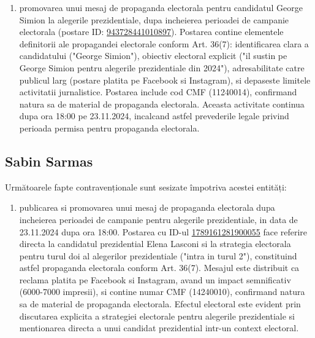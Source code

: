 \documentclass[a4paper,12pt]{article}
\begin{document}
\begin{enumerate}[leftmargin=*, label=\arabic*.)]
    \item promovarea unui mesaj de propaganda electorala pentru candidatul George Simion la alegerile prezidentiale, dupa incheierea perioadei de campanie electorala (postare ID: \href{https://www.facebook.com/ads/library/?id=943728441010897}{943728441010897}). Postarea contine elementele definitorii ale propagandei electorale conform Art. 36(7): identificarea clara a candidatului ("George Simion"), obiectiv electoral explicit ("il sustin pe George Simion pentru alegerile prezidentiale din 2024"), adresabilitate catre publicul larg (postare platita pe Facebook si Instagram), si depaseste limitele activitatii jurnalistice. Postarea include cod CMF (11240014), confirmand natura sa de material de propaganda electorala. Aceasta activitate continua dupa ora 18:00 pe 23.11.2024, incalcand astfel prevederile legale privind perioada permisa pentru propaganda electorala.
\end{enumerate}

\vspace{0.5cm}

\subsection{Sabin Sarmas}
Următoarele fapte contravenționale sunt sesizate împotriva acestei entități:

\begin{enumerate}[leftmargin=*, label=\arabic*.)]
    \item publicarea si promovarea unui mesaj de propaganda electorala dupa incheierea perioadei de campanie pentru alegerile prezidentiale, in data de 23.11.2024 dupa ora 18:00. Postarea cu ID-ul \href{https://www.facebook.com/ads/library/?id=1789161281900055}{1789161281900055} face referire directa la candidatul prezidential Elena Lasconi si la strategia electorala pentru turul doi al alegerilor prezidentiale ("intra in turul 2"), constituind astfel propaganda electorala conform Art. 36(7). Mesajul este distribuit ca reclama platita pe Facebook si Instagram, avand un impact semnificativ (6000-7000 impresii), si contine numar CMF (14240010), confirmand natura sa de material de propaganda electorala. Efectul electoral este evident prin discutarea explicita a strategiei electorale pentru alegerile prezidentiale si mentionarea directa a unui candidat prezidential intr-un context electoral.
\end{enumerate}

\vspace{0.5cm}
\end{document}

